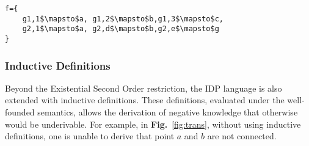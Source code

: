 \begin{minipage}{\linewidth}
\begin{lstlisting}[mathescape,caption=An possible assignment for f, label=lst:invalidf]
f={
    g1,1$\mapsto$a, g1,2$\mapsto$b,g1,3$\mapsto$c,
    g2,1$\mapsto$a, g2,d$\mapsto$b,g2,e$\mapsto$g
}
\end{lstlisting}
\end{minipage}



\subsubsection{Inductive Definitions}
Beyond the Existential Second Order restriction, the IDP language is also extended with inductive definitions. These definitions, evaluated under the well-founded semantics, allows the derivation of negative knowledge that otherwise would be underivable.
For example, in \textbf{Fig.}~\ref{fig:trans}, without using inductive definitions, one is unable to derive that point $a$ and $b$ are not connected.
\begin{figure}[h]
    \centering
\end{figure}

